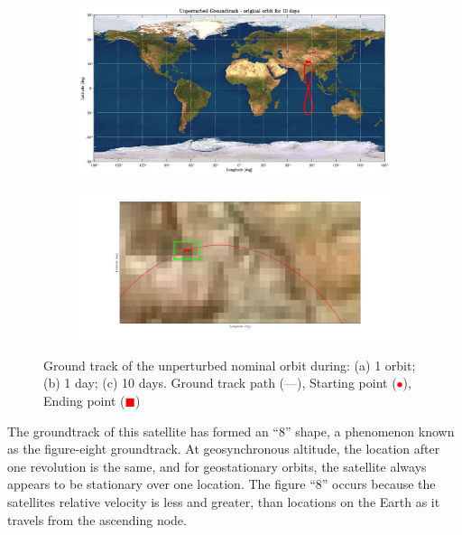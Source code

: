\documentclass{article}
\newcommand{\reddashedline}{\textcolor{red}{---}}
\begin{document}
\begin{figure}[H]
	\vspace{1cm} %
	\begin{subfigure}[b]{0.45\textwidth}
		\includegraphics[width=\textwidth]{ug10d.eps}
		\caption{}
		\label{fig:2c}
	\end{subfigure}
	\hfill
	\begin{subfigure}[b]{0.45\textwidth}
		\includegraphics[width=\textwidth]{ugstartend.png}
		\caption{}
		\label{fig:2d}
	\end{subfigure}
	\caption{Ground track of the unperturbed nominal orbit during: (a) 1 orbit; (b) 1 day; (c) 10 days. Ground track path (\reddashedline), Starting point (\textcolor{red}{$\bullet$}), Ending point (\textcolor{red}{$\blacksquare$})
	}
\end{figure}


The groundtrack of this satellite has formed an “8” shape, a phenomenon known as the figure-eight groundtrack. At geosynchronous altitude, the location after one revolution is the same, and for geostationary  orbits, the satellite always appears to be stationary over one location. The figure “8” occurs because the satellites relative velocity is less and greater, than locations on the Earth as it travels from the ascending node. 
\end{document}
